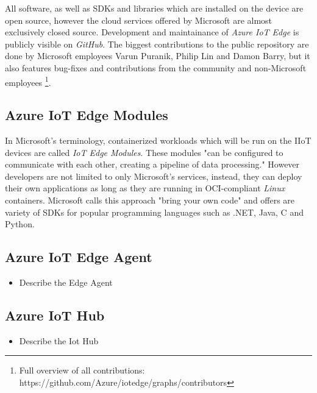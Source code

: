 All software, as well as \ac{SDK}s and
libraries which are installed on the device are open source, however the
cloud services offered by Microsoft are almost exclusively closed source.
Development and maintainance of \textit{Azure IoT Edge} is publicly visible on
\textit{GitHub}. The biggest contributions
to the public repository are done by Microsoft employees Varun Puranik,
Philip Lin and Damon Barry, but it also features bug-fixes and contributions
from the community and non-Microsoft employees
\footnote{Full overview of all contributions: https://github.com/Azure/iotedge/graphs/contributors}.

\subsection{Azure IoT Edge Modules}
In Microsoft's terminology, containerized workloads which will be run on the \ac{IIoT}
devices are called \textit{IoT Edge Modules}. These modules "can be configured to
communicate with each other, creating a pipeline of data processing." However developers are
not limited to only Microsoft's services, instead, they can deploy their own
applications as long as they are running in \ac{OCI}-compliant \textit{Linux} containers.
Microsoft calls this approach "bring your own code" and offers are variety of
\ac{SDK}s for popular programming languages such as .NET, Java, C and Python\cite{msdoc-supportetplatforms}.

\subsection{Azure IoT Edge Agent}
\begin{tcolorbox}[title=TODO]
    \begin{itemize}
        \item Describe the Edge Agent
    \end{itemize}
\end{tcolorbox}

\subsection{Azure IoT Hub}
\begin{tcolorbox}[title=TODO]
    \begin{itemize}
        \item Describe the Iot Hub
    \end{itemize}
\end{tcolorbox}

